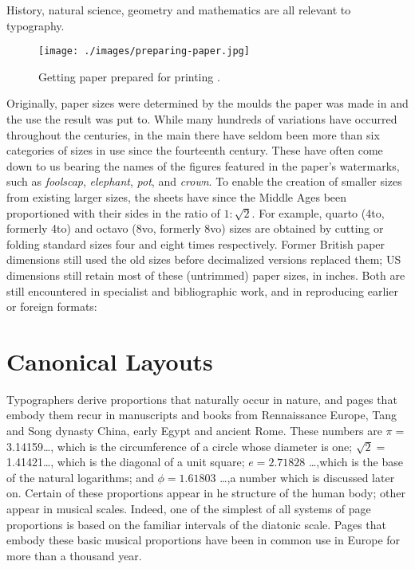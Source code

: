History, natural science, geometry and mathematics are all relevant to typography.


\begin{figure}[ht]
\centering
\texttt{[image: ./images/preparing-paper.jpg]}
\caption{Getting paper prepared for printing \protect\cite{moxon}.}
\end{figure}

Originally, paper sizes were determined by the moulds the paper was
made in and the use the result was put to. While many hundreds of variations have occurred throughout the centuries, in the main there have seldom been more than six categories of sizes in use since the fourteenth century. These have often come down to us bearing the names of the figures featured in the paper's watermarks, such as \emph{foolscap},
\emph{elephant}, \emph{pot}, and \emph{crown}. To enable the creation of smaller sizes from
existing larger sizes, the sheets have since the Middle Ages been proportioned
with their sides in the ratio of \(1:\sqrt{2}\). For example, quarto (4to,
formerly 4to) and octavo (8vo, formerly 8vo) sizes are obtained by cutting
or folding standard sizes four and eight times respectively.
Former British paper dimensions still used the old sizes before decimalized
versions replaced them; US dimensions still retain most of these
(untrimmed) paper sizes, in inches. Both are still encountered in specialist and bibliographic work, and in reproducing earlier or foreign formats:


\section{Canonical Layouts}

Typographers derive proportions that naturally occur in nature, and pages that embody
them recur in manuscripts and books from Rennaissance Europe, Tang and Song dynasty
China, early Egypt and ancient Rome.  
These numbers are $\pi=$3.14159\ldots , which is the circumference of a circle whose diameter
is one; $\sqrt{2}=$1.41421\ldots , which is the diagonal of a unit square; 
$e=2.71828$  \ldots ,which is the base of the natural logarithms; and $\phi=1.61803$ \ldots ,a number which is discussed later on. Certain of these proportions appear in he structure of the human body; other appear in musical scales. Indeed, one of the simplest of all systems of 
page proportions is based on the familiar intervals of the diatonic scale. Pages that
embody these basic musical proportions have been in common use in Europe for more than a thousand year.

